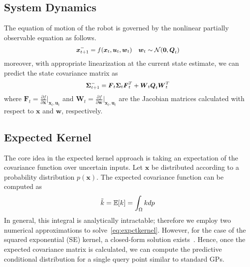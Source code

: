 \documentclass[letterpaper, 10 pt, journal, twoside]{IEEEtran}  %
\begin{document}
\subsection{System Dynamics}
\label{subsec:sysdayn}
The equation of motion of the robot is governed by the nonlinear partially observable equation as follows.
\begin{equation}
\small
\label{eq:reom}
\boldsymbol x_{t+1}^- = f(\boldsymbol x_{t}, \boldsymbol u_{t}, \boldsymbol w_{t}) \quad \boldsymbol w_{t} \sim \mathcal{N}(\boldsymbol 0,\boldsymbol Q_{t})
\end{equation}
moreover, with appropriate linearization at the current state estimate, we can predict the state covariance matrix as
\begin{equation}
\small
\label{eq:predcov}
 \boldsymbol \Sigma_{t+1}^- = \boldsymbol F_t \boldsymbol \Sigma_{t} \boldsymbol F_t^T + \boldsymbol W_t \boldsymbol Q_t \boldsymbol W_t^T
\end{equation}
where $\boldsymbol F_t = \frac{\partial f}{\partial \boldsymbol x} \vert_{\boldsymbol x_{t}, \boldsymbol u_{t}}$ and $\boldsymbol W_t = \frac{\partial f}{\partial \boldsymbol w} \vert_{\boldsymbol x_{t}, \boldsymbol u_{t}}$ are the Jacobian matrices calculated with respect to $\boldsymbol x$ and $\boldsymbol w$, respectively.

\subsection{Expected Kernel}
\label{subsec:ukernel}

The core idea in the expected kernel approach is taking an expectation of the covariance function over uncertain inputs. Let $\boldsymbol x$ be distributed according to a probability distribution $p(\boldsymbol x)$. The expected covariance function can be computed as
\begin{equation}
 \small
 \label{eq:expctkernel}
  \tilde{k} = \mathbb{E}[k] = \int_{\Omega} kdp
\end{equation}
In general, this integral is analytically intractable; therefore we employ two numerical approximations to solve~\eqref{eq:expctkernel}. However, for the case of the squared exponential (SE) kernel, a closed-form solution exists~\cite{NIPS2002_2313}. Hence, once the expected covariance matrix is calculated, we can compute the predictive conditional distribution for a single query point similar to standard GPs.
\end{document}
